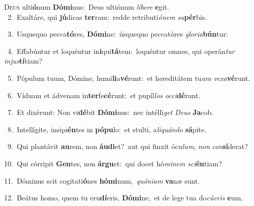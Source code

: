 \lettrine{\initial\textcolor{\initialcolor}{D}}{eus} ulti\-\textbf{ó}\-num \textbf{Dó}\-\textbf{mi}nus:~\star Deus ultiónum \textit{lí}\-\textit{be}\textit{re} \textbf{e}\-git.\\
{\numbfont\textcolor{\numbcolor}{~2.}}~Exaltáre, qui \textbf{jú}\-dicas \textbf{ter}\-ram:~\star redde retributi\-\textit{ó}\-\textit{nem} \textit{su}\-\textbf{pér}bis.\par
{\numbfont\textcolor{\numbcolor}{~3.}}~Usquequo pecca\-\textbf{tó}\-res, \textbf{Dó}\-\textbf{mi}ne:~\star úsquequo peccatóres \textit{glo}\-\textit{ri}\textit{a}\textbf{bún}tur:\par
{\numbfont\textcolor{\numbcolor}{~4.}}~Effabúntur et loquéntur in\-\textbf{i}\-qui\-\textbf{tá}\-tem:~\star loquéntur omnes, qui operán\textit{tur} \textit{in}\-\textit{jus}\textbf{tí}tiam?\par
{\numbfont\textcolor{\numbcolor}{~5.}}~Pópulum tuum, Dómine, humi\-\textbf{li}\-a\-\textbf{vé}\-runt:~\star et hereditátem tu\textit{am} \textit{ve}\-\textit{xa}\textbf{vé}runt.\par
{\numbfont\textcolor{\numbcolor}{~6.}}~Víduam et ádvenam in\-\textbf{ter}\-fe\-\textbf{cé}\-runt:~\star et pupíl\textit{los} \textit{oc}\-\textit{ci}\textbf{dé}runt.\par
{\numbfont\textcolor{\numbcolor}{~7.}}~Et dixérunt: Non vi\-\textbf{dé}\-bit \textbf{Dó}\-\textbf{mi}nus:~\star nec intélli\textit{get} \textit{De}\-\textit{us} \textbf{Ja}\-cob.\par
{\numbfont\textcolor{\numbcolor}{~8.}}~Intellígite, insipi\-\textbf{én}\-tes in \textbf{pó}\-\textbf{pu}lo:~\star et stulti, a\-\textit{li}\-\textit{quán}\textit{do} \textbf{sá}\-pite.\par
{\numbfont\textcolor{\numbcolor}{~9.}}~Qui plantávit \textbf{au}\-rem, non \textbf{áu}\-\textbf{di}et?~\star aut qui finxit ócu\-\textit{lum}\-, \textit{non} \textit{con}\-\textbf{sí}derat?\par
{\numbfont\textcolor{\numbcolor}{10.}}~Qui córripit \textbf{Gen}\-tes, non \textbf{ár}\-\textbf{gu}et:~\star qui docet hó\-\textit{mi}\-\textit{nem} \textit{sci}\-\textbf{én}tiam?\par
{\numbfont\textcolor{\numbcolor}{11.}}~Dóminus scit cogitati\-\textbf{ó}\-nes \textbf{hó}\-\textbf{mi}num,~\star \textit{quón}\-\textit{i}\textit{am} \textbf{va}\-næ sunt.\par
{\numbfont\textcolor{\numbcolor}{12.}}~Beátus homo, quem tu eru\-\textbf{dí}\-eris, \textbf{Dó}\-\textbf{mi}ne,~\star et de lege tua do\-\textit{cú}\-\textit{e}\textit{ris} \textbf{e}\-um.\par
